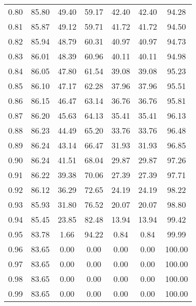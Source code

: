 \begin{tabular}{|c|c|c|c|c|c|c|}
      0.80 &     85.80 &     49.40 &      59.17 &   42.40 &      42.40 &         94.28 \\
      0.81 &     85.87 &     49.12 &      59.71 &   41.72 &      41.72 &         94.50 \\
      0.82 &     85.94 &     48.79 &      60.31 &   40.97 &      40.97 &         94.73 \\
      0.83 &     86.01 &     48.39 &      60.96 &   40.11 &      40.11 &         94.98 \\
      0.84 &     86.05 &     47.80 &      61.54 &   39.08 &      39.08 &         95.23 \\
      0.85 &     86.10 &     47.17 &      62.28 &   37.96 &      37.96 &         95.51 \\
      0.86 &     86.15 &     46.47 &      63.14 &   36.76 &      36.76 &         95.81 \\
      0.87 &     86.20 &     45.63 &      64.13 &   35.41 &      35.41 &         96.13 \\
      0.88 &     86.23 &     44.49 &      65.20 &   33.76 &      33.76 &         96.48 \\
      0.89 &     86.24 &     43.14 &      66.47 &   31.93 &      31.93 &         96.85 \\
      0.90 &     86.24 &     41.51 &      68.04 &   29.87 &      29.87 &         97.26 \\
      0.91 &     86.22 &     39.38 &      70.06 &   27.39 &      27.39 &         97.71 \\
      0.92 &     86.12 &     36.29 &      72.65 &   24.19 &      24.19 &         98.22 \\
      0.93 &     85.93 &     31.80 &      76.52 &   20.07 &      20.07 &         98.80 \\
      0.94 &     85.45 &     23.85 &      82.48 &   13.94 &      13.94 &         99.42 \\
      0.95 &     83.78 &      1.66 &      94.22 &    0.84 &       0.84 &         99.99 \\
      0.96 &     83.65 &      0.00 &       0.00 &    0.00 &       0.00 &        100.00 \\
      0.97 &     83.65 &      0.00 &       0.00 &    0.00 &       0.00 &        100.00 \\
      0.98 &     83.65 &      0.00 &       0.00 &    0.00 &       0.00 &        100.00 \\
      0.99 &     83.65 &      0.00 &       0.00 &    0.00 &       0.00 &        100.00 \\
\bottomrule
\end{tabular}
